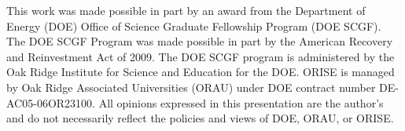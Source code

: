 This work was made possible in part by an award from the Department of Energy (DOE) Office of Science Graduate Fellowship Program (DOE SCGF). 
The DOE SCGF Program was made possible in part by the American Recovery and Reinvestment Act of 2009. 
The DOE SCGF program is administered by the Oak Ridge Institute for Science and Education for the DOE. 
ORISE is managed by Oak Ridge Associated Universities (ORAU) under DOE contract number DE- AC05-06OR23100. 
All opinions expressed in this presentation are the author's and do not necessarily reflect the policies and views of DOE, ORAU, or ORISE.

